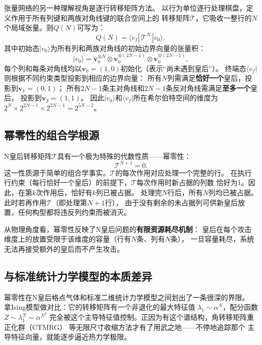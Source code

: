 张量网络的另一种理解视角是逐行转移矩阵方法\cite{Xiang2024}。
以行为单位逐行处理棋盘，定义作用于所有列键和两族对角线键的联合空间上的
转移矩阵$\mathcal{T}$，它吸收一整行的$N$个局域张量。则$Q(N)$可写为：
%
\begin{equation}
  Q(N) = \langle v_{f}|\,\mathcal{T}^{N}\,|v_{0}\rangle,
  \label{eq:QN_transfer}
\end{equation}
%
其中初始态$|v_{0}\rangle$为所有列和两族对角线的初始边界向量的张量积：
%
\begin{equation}
  |v_{0}\rangle = \mathbf{v}_{0}^{\otimes N}
                 \otimes \mathbf{v}_{0}^{\otimes(2N-1)}
                 \otimes \mathbf{v}_{0}^{\otimes(2N-1)},
\end{equation}
%
每个列和每条对角线均以$\mathbf{v}_{0}=(1,0)$初始化（表示``尚未遇到皇后''）。
终端态$\langle v_{f}|$则根据不同约束类型投影到相应的边界向量：
所有$N$列需满足\textbf{恰好一个}皇后，投影到$\mathbf{v}_{1}=(0,1)$；
所有$2N-1$条主对角线和$2N-1$条反对角线需满足\textbf{至多一个}皇后，
投影到$\mathbf{v}_{2}=(1,1)$。
因此$|v_{0}\rangle$和$\langle v_{f}|$所在希尔伯特空间的维度为
$2^{N}\times2^{2N-1}\times2^{2N-1}=2^{5N-2}$。

\subsection{幂零性的组合学根源}

N皇后转移矩阵$\mathcal{T}$具有一个极为特殊的代数性质——幂零性：
%
\begin{equation}
  \mathcal{T}^{N+1} = 0.
  \label{eq:nilpotent}
\end{equation}
%
这一性质源于简单的组合学事实。$\mathcal{T}$的每次作用对应处理一个完整的行。
在执行行约束（每行恰好一个皇后）的前提下，$\mathcal{T}$每次作用时新占据的列数
恰好为1。因此，在第$k$次作用后，恰好有$k$列已被占据。
处理完$N$行后，所有$N$列均已被占据。此时若再作用$\mathcal{T}$（即处理第$N+1$行），
由于没有剩余的未占据列可供新皇后放置，任何构型都将违反列约束而被消灭。

从物理角度看，幂零性反映了N皇后问题的\textbf{有限资源耗尽机制}：
皇后在每个攻击维度上的放置受限于该维度的容量（行有$N$条、列有$N$条），
一旦容量耗尽，系统无法再接受额外的皇后而不产生攻击。

\subsection{与标准统计力学模型的本质差异}

幂零性在N皇后格点气体和标准二维统计力学模型之间划出了一条很深的界限。
拿Ising模型做对比：它的转移矩阵有一个非退化的最大特征值
$\lambda_{1}\sim\alpha^{N}$，配分函数$Z\sim\lambda_{1}^{N}\sim\alpha^{N^{2}}$
完全被这个主导特征值控制。正因为有这个谱结构，角转移矩阵重正化群（CTMRG）
\cite{Nishino1996}等无限尺寸收缩方法才有了用武之地——不停地追踪那个
主导特征向量，就能逐步逼近热力学极限。

